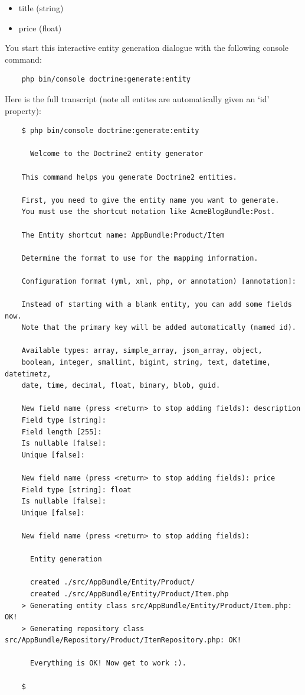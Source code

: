 \documentclass[a4paperpaper,openright]{book}
\providecommand{\tightlist}{%
  \setlength{\itemsep}{0pt}\setlength{\parskip}{0pt}}
\begin{document}
\begin{itemize}
\tightlist
\item
  title (string)
\item
  price (float)
\end{itemize}

You start this interactive entity generation dialogue with the following
console command:

\begin{verbatim}
    php bin/console doctrine:generate:entity
\end{verbatim}

Here is the full transcript (note all entites are automatically given an
`id' property):

\begin{verbatim}
    $ php bin/console doctrine:generate:entity

      Welcome to the Doctrine2 entity generator

    This command helps you generate Doctrine2 entities.

    First, you need to give the entity name you want to generate.
    You must use the shortcut notation like AcmeBlogBundle:Post.

    The Entity shortcut name: AppBundle:Product/Item

    Determine the format to use for the mapping information.

    Configuration format (yml, xml, php, or annotation) [annotation]:

    Instead of starting with a blank entity, you can add some fields now.
    Note that the primary key will be added automatically (named id).

    Available types: array, simple_array, json_array, object,
    boolean, integer, smallint, bigint, string, text, datetime, datetimetz,
    date, time, decimal, float, binary, blob, guid.

    New field name (press <return> to stop adding fields): description
    Field type [string]:
    Field length [255]:
    Is nullable [false]:
    Unique [false]:

    New field name (press <return> to stop adding fields): price
    Field type [string]: float
    Is nullable [false]:
    Unique [false]:

    New field name (press <return> to stop adding fields):

      Entity generation

      created ./src/AppBundle/Entity/Product/
      created ./src/AppBundle/Entity/Product/Item.php
    > Generating entity class src/AppBundle/Entity/Product/Item.php: OK!
    > Generating repository class src/AppBundle/Repository/Product/ItemRepository.php: OK!

      Everything is OK! Now get to work :).

    $
\end{verbatim}
\end{document}
